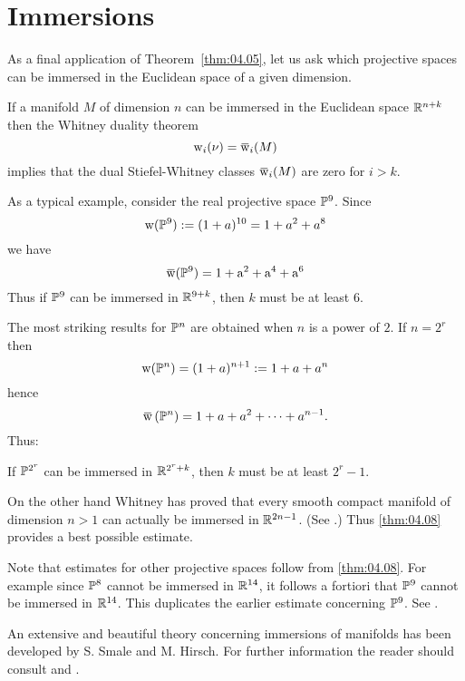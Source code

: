 \documentclass[../main]{subfiles}
\begin{document}
\section{Immersions}\label{sec:4.3}

As a final application of Theorem~\ref{thm:04.05}, let us ask which projective spaces can be immersed in the Euclidean space of a given dimension.

If a manifold $M$ of dimension $n$ can be immersed in the Euclidean space $\mathbb R^{n+k}$ then the Whitney duality theorem
\[
\sw_{i}(\nu)=\xoverline{\sw}_{i}(M)
\]
implies that the dual Stiefel-Whitney classes $\xoverline{\sw}_{i}(M)$ are zero for $i>k$.

As a typical example, consider the real projective space $\mathbb{P}^{9}$. Since
\[
\operatorname{w}(\mathbb{P}^{9}):=(1+a)^{10}=1+a^{2}+a^{8}
\]
we have
\[
\xoverline{\sw}(\projective^{9})=1+\mathrm{a}^{2}+\mathrm{a}^{4}+\mathrm{a}^{6}
\]
Thus if $\mathbb{P}^{9}$ can be immersed in $\mathbb R^{9+k}$, then $k$ must be at least $6$.

The most striking results for $\mathbb{P}^{n}$ are obtained when $n$ is a power of $2$. If $n=2^{r}$ then
\[
\operatorname{w}(\mathbb{P}^{n})=(1+a)^{n+1}:=1+a+a^{n}
\]
hence
\[
\xoverline{\sw}\left(\projective^{n}\right)=1+a+a^{2}+\dots+a^{n-1}.
\]
Thus:
\begin{theorem}\label{thm:04.08}
	If $\mathbb{P}^{2^{r}}$ can be immersed in $\mathbb R^{2^{r}+k}$, then $k$ must be at least $2^{r}-1$.
\end{theorem}

On the other hand Whitney has proved that every smooth compact manifold of dimension $n>1$ can actually be immersed in $\mathbb R^{2 n-1}$. (See \cite{whitney1944}.) Thus \ref{thm:04.08} provides a best possible estimate.

Note that estimates for other projective spaces follow from \ref{thm:04.08}. For example since $\mathbb{P}^{8}$ cannot be immersed in $\mathbb R^{14}$, it follows a fortiori that $\mathbb{P}^{9}$ cannot be immersed in $\mathbb R^{14}$. This duplicates the earlier estimate concerning $\mathbb{P}^{9}$. See \cite{james1971}.

An extensive and beautiful theory concerning immersions of manifolds has been developed by S. Smale and M. Hirsch. For further information the reader should consult \cite{hirsch1959} and \cite{smale1959}.
\end{document}
